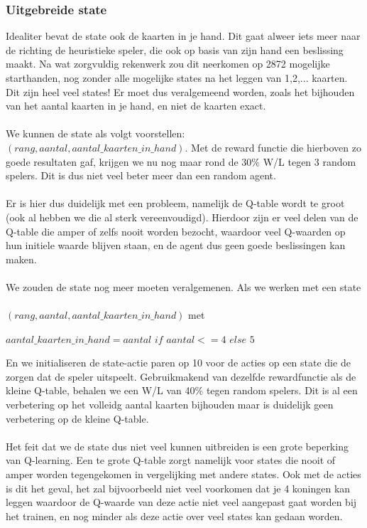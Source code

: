 \documentclass[11pt]{article}
\begin{document}
\subsubsection{Uitgebreide state}
Idealiter bevat de state ook de kaarten in je hand. Dit gaat alweer iets meer naar de richting de heuristieke speler, die ook op basis van zijn hand een beslissing maakt. Na wat zorgvuldig rekenwerk zou dit neerkomen op 2872 mogelijke starthanden, nog zonder alle mogelijke states na het leggen van 1,2,... kaarten. Dit zijn heel veel states! Er moet dus veralgemeend worden, zoals het bijhouden van het aantal kaarten in je hand, en niet de kaarten exact.\\\\
We kunnen de state als volgt voorstellen: $(rang, aantal, aantal\_kaarten\_in\_hand)$. Met de reward functie die hierboven zo goede resultaten gaf, krijgen we nu nog maar rond de 30\% W/L tegen 3 random spelers. Dit is dus niet veel beter meer dan een random agent.\\\\
Er is hier dus duidelijk met een probleem, namelijk de Q-table wordt te groot (ook al hebben we die al sterk vereenvoudigd). Hierdoor zijn er veel delen van de Q-table die amper of zelfs nooit worden bezocht, waardoor veel Q-waarden op hun initiele waarde blijven staan, en de agent dus geen goede beslissingen kan maken.\\\\
We zouden de state nog meer moeten veralgemenen. Als we werken met een state\\\\
\indent $(rang, aantal, aantal\_kaarten\_in\_hand)$ met
\begin{center}
$aantal\_kaarten\_in\_hand = aantal$ $if$ $ aantal <= 4$ $else$ $5$
\end{center}
En we initialiseren de state-actie paren op 10 voor de acties op een state die de zorgen dat de speler uitspeelt. Gebruikmakend van dezelfde rewardfunctie als de kleine Q-table, behalen we een W/L van 40\% tegen random spelers. Dit is al een verbetering op het volleidg aantal kaarten bijhouden maar is duidelijk geen verbetering op de kleine Q-table.\\\\
Het feit dat we de state dus niet veel kunnen uitbreiden is een grote beperking van Q-learning. Een te grote Q-table zorgt namelijk voor states die nooit of amper worden tegengekomen in vergelijking met andere states. Ook met de acties is dit het geval, het zal bijvoorbeeld niet veel voorkomen dat je 4 koningen kan leggen waardoor de Q-waarde van deze actie niet veel aangepast gaat worden bij het trainen, en nog minder als deze actie over veel states kan gedaan worden. \\\\
\end{document}
